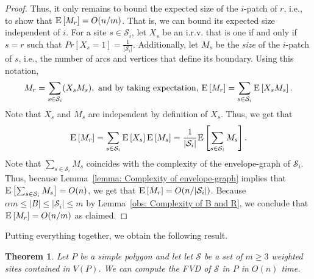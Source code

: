 \documentclass[a4paper, 11pt]{article}
\newtheorem{theorem}{Theorem}[section]
\newcommand{\icell}[1][i]{${#1}$-patch\xspace}
\newcommand{\s}{\mathcal S}
\newcommand{\ex}[1]{\textsc{E}\left[#1\right]}
\begin{document}
\begin{proof}
Thus, it only remains to bound the expected size of the \icell of $r$, i.e., to show that $\ex{M_r} = O(n/m)$.
That is, we can bound its expected size independent of $i$.
For a site $s\in \s_i$, let $X_s$ be an i.r.v. that is one if and only if $s = r$ such that $Pr[X_s = 1] = \frac{1}{|\s_i|}$.
Additionally, let $M_s$ be the \emph{size} of the \icell of $s$, i.e., the number of arcs and vertices that define its boundary. 
Using this notation,
\[M_r = \sum_{s\in \s_i} ( X_s M_s), \text{ and by taking expectation, } \ex{M_r} = \sum_{s\in \s_i} \ex{X_s M_s}.\]
Note that $X_s$ and $M_s$ are independent by definition of $X_s$.
Thus, we get that  
\[\ex{M_r} = \sum_{s\in \s_i} \ex{X_s} \ex{M_s} = \frac{1}{|\s_i|} \ex{\sum_{s\in \s_i} M_s}.\]
Note that $\sum_{s\in \s_i} M_s$ coincides with the complexity of the envelope-graph of $\s_i$.
Thus, because Lemma~\ref{lemma: Complexity of envelope-graph} implies that $\ex{\sum_{s\in \s_i} M_s} = O(n)$, we get that  $\ex{M_r} = O(n/|\s_i|)$.
Because $\alpha m \leq |B| \leq |\s_i| \leq m$ by Lemma~\ref{obs: Complexity of B and R}, we conclude that $\ex{M_r} = O(n/m)$ as claimed.
\end{proof}

Putting everything together, we obtain the following result.

\begin{theorem}
Let  $P$ be a simple polygon and let let $\s$ be a set of $m\geq 3$ weighted sites contained in $V(P)$.
We can compute the FVD of $\s$ in $P$ in $O(n)$ time. 
\end{theorem}


{\small

}

\end{document}
